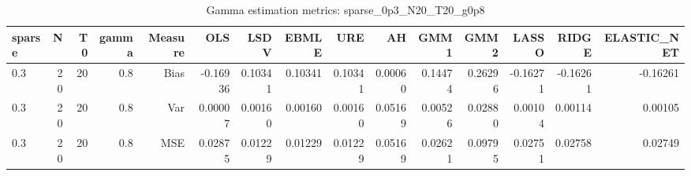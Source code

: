 \begin{table}[!htbp]\centering
\caption{Gamma estimation metrics: sparse_0p3_N20_T20_g0p8}
\label{tab:table1_sparse_0p3_N20_T20_g0p8}
\begin{tabular}{lrrrrrrrrrrrrrr}
\hline
sparse & N & T0 & gamma & Measure & OLS & LSDV & EBMLE & URE & AH & GMM1 & GMM2 & LASSO & RIDGE & ELASTIC_NET \\
\hline
0.3 & 20 & 20 & 0.8 & Bias & -0.16936 & 0.10341 & 0.10341 & 0.10341 & 0.00060 & 0.14474 & 0.26296 & -0.16271 & -0.16261 & -0.16261 \\
0.3 & 20 & 20 & 0.8 & Var & 0.00007 & 0.00160 & 0.00160 & 0.00160 & 0.05169 & 0.00526 & 0.02880 & 0.00104 & 0.00114 & 0.00105 \\
0.3 & 20 & 20 & 0.8 & MSE & 0.02875 & 0.01229 & 0.01229 & 0.01229 & 0.05169 & 0.02621 & 0.09795 & 0.02751 & 0.02758 & 0.02749 \\
\hline
\end{tabular}
\end{table}

